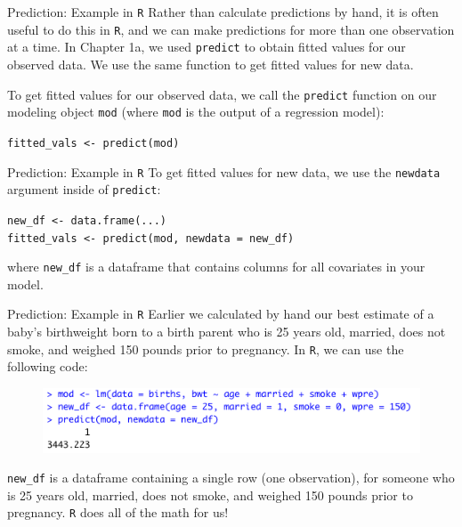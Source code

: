 \documentclass[10pt,t]{beamer}
\begin{document}
\begin{frame}{Prediction: Example in \texttt{R}}
Rather than calculate predictions by hand, it is often useful to do this in \texttt{R}, and we can make predictions for more than one observation at a time. In Chapter 1a, we used \texttt{predict} to obtain fitted values for our observed data. We use the same function to get fitted values for new data.

\vspace{0.3cm}

To get fitted values for our observed data, we call the \texttt{predict} function on our modeling object \texttt{mod} (where \texttt{mod} is the output of a regression model):

\vspace{0.3cm}

\texttt{fitted\_vals <- predict(mod)}
\end{frame}

\begin{frame}{Prediction: Example in \texttt{R}}
To get fitted values for new data, we use the \texttt{newdata} argument inside of \texttt{predict}:

\vspace{0.3cm}

\texttt{new\_df <- data.frame(...)} \\
\texttt{fitted\_vals <- predict(mod, newdata = new\_df)}

\vspace{0.3cm}

where \texttt{new\_df} is a dataframe that contains columns for all covariates in your model.

\end{frame}

\begin{frame}{Prediction: Example in \texttt{R}}
Earlier we calculated by hand our best estimate of a baby's birthweight born to a birth parent who is 25 years old, married, does not smoke, and weighed 150 pounds prior to pregnancy. In \texttt{R}, we can use the following code:

\vspace{0.3cm}

\begin{figure}
	\centering \includegraphics[scale=0.5]{newdata_example.png}
\end{figure}

\vspace{0.3cm}

\texttt{new\_df} is a dataframe containing a single row (one observation), for someone who is 25 years old, married, does not smoke, and weighed 150 pounds prior to pregnancy. \texttt{R} does all of the math for us!

\end{frame}
\end{document}
